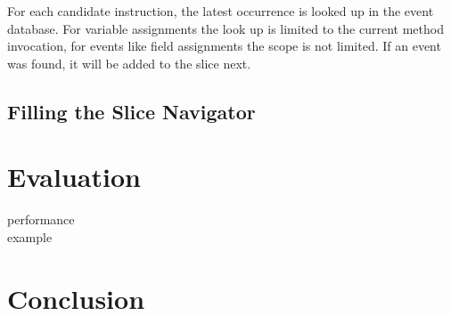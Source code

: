 ﻿\documentclass[
      english,
			conference,
      ]{IEEEtran}
\begin{document}
For each candidate instruction, the latest occurrence is looked up in the event database.
For variable assignments the look up is limited to the current method invocation, for events like field assignments the scope is not limited.
If an event was found, it will be added to the slice next.


\subsection{Filling the Slice Navigator}









\section{Evaluation}
\label{sec:eval}

performance\\

example\\

\section{Conclusion}
\label{sec:conclusion}


\printbibliography
\end{document}
